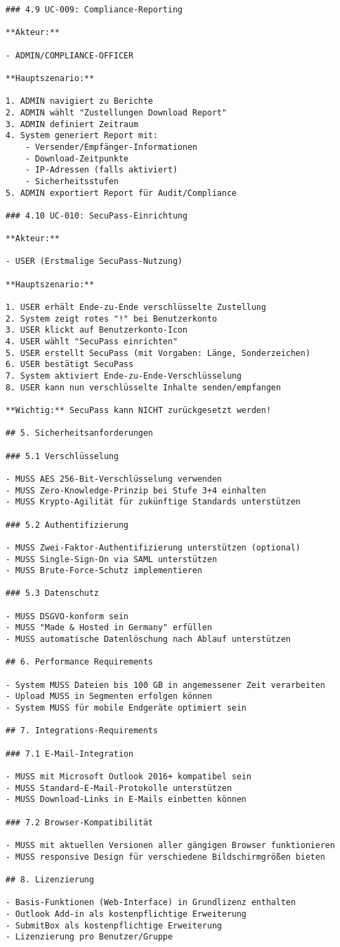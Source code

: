 \begin{Verbatim}[breaklines=true]
### 4.9 UC-009: Compliance-Reporting

**Akteur:**

- ADMIN/COMPLIANCE-OFFICER

**Hauptszenario:**

1. ADMIN navigiert zu Berichte
2. ADMIN wählt "Zustellungen Download Report"
3. ADMIN definiert Zeitraum
4. System generiert Report mit:
    - Versender/Empfänger-Informationen
    - Download-Zeitpunkte
    - IP-Adressen (falls aktiviert)
    - Sicherheitsstufen
5. ADMIN exportiert Report für Audit/Compliance

### 4.10 UC-010: SecuPass-Einrichtung

**Akteur:**

- USER (Erstmalige SecuPass-Nutzung)

**Hauptszenario:**

1. USER erhält Ende-zu-Ende verschlüsselte Zustellung
2. System zeigt rotes "!" bei Benutzerkonto
3. USER klickt auf Benutzerkonto-Icon
4. USER wählt "SecuPass einrichten"
5. USER erstellt SecuPass (mit Vorgaben: Länge, Sonderzeichen)
6. USER bestätigt SecuPass
7. System aktiviert Ende-zu-Ende-Verschlüsselung
8. USER kann nun verschlüsselte Inhalte senden/empfangen

**Wichtig:** SecuPass kann NICHT zurückgesetzt werden!

## 5. Sicherheitsanforderungen

### 5.1 Verschlüsselung

- MUSS AES 256-Bit-Verschlüsselung verwenden
- MUSS Zero-Knowledge-Prinzip bei Stufe 3+4 einhalten
- MUSS Krypto-Agilität für zukünftige Standards unterstützen

### 5.2 Authentifizierung

- MUSS Zwei-Faktor-Authentifizierung unterstützen (optional)
- MUSS Single-Sign-On via SAML unterstützen
- MUSS Brute-Force-Schutz implementieren

### 5.3 Datenschutz

- MUSS DSGVO-konform sein
- MUSS "Made & Hosted in Germany" erfüllen
- MUSS automatische Datenlöschung nach Ablauf unterstützen

## 6. Performance Requirements

- System MUSS Dateien bis 100 GB in angemessener Zeit verarbeiten
- Upload MUSS in Segmenten erfolgen können
- System MUSS für mobile Endgeräte optimiert sein

## 7. Integrations-Requirements

### 7.1 E-Mail-Integration

- MUSS mit Microsoft Outlook 2016+ kompatibel sein
- MUSS Standard-E-Mail-Protokolle unterstützen
- MUSS Download-Links in E-Mails einbetten können

### 7.2 Browser-Kompatibilität

- MUSS mit aktuellen Versionen aller gängigen Browser funktionieren
- MUSS responsive Design für verschiedene Bildschirmgrößen bieten

## 8. Lizenzierung

- Basis-Funktionen (Web-Interface) in Grundlizenz enthalten
- Outlook Add-in als kostenpflichtige Erweiterung
- SubmitBox als kostenpflichtige Erweiterung
- Lizenzierung pro Benutzer/Gruppe
\end{Verbatim}
